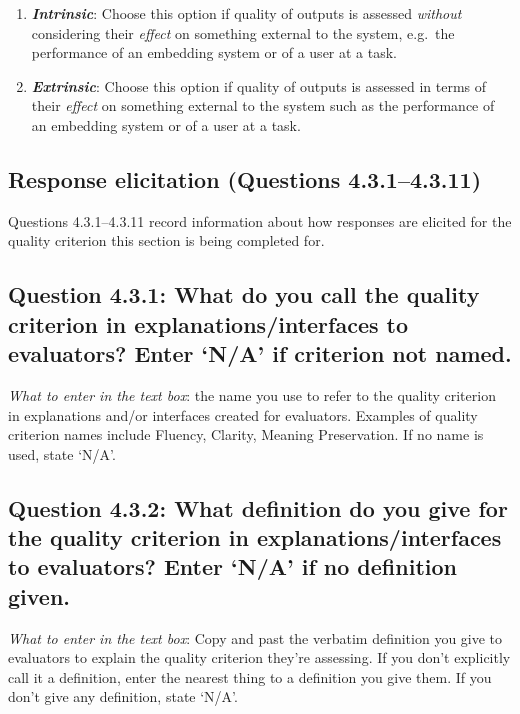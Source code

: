 \documentclass[11pt,a4paper]{article}
\newcommand{\egcvalue}[1]{\textbf{\textit{#1}}}
\begin{document}
\begin{enumerate}[itemsep=0cm,leftmargin=0.5cm,label={\LARGE $\circ$}]
    \item \egcvalue{Intrinsic}: Choose this option if quality of outputs is assessed \textit{without} considering their \textit{effect} on something external to the system, e.g.\ the performance of an embedding system or of a user at a task.
    \item \egcvalue{Extrinsic}: Choose this option if quality of outputs is assessed in terms of their \textit{effect} on something external to the system such as the performance of an embedding system or of a user at a task.
\end{enumerate}

   
\subsection{Response elicitation (Questions 4.3.1--4.3.11)}

Questions 4.3.1--4.3.11 record information about how responses are elicited for the quality criterion this section is being completed for.

\vspace{-.3cm}
\subsection*{Question 4.3.1: What do you call the quality criterion in explanations/interfaces to evaluators?  Enter `N/A' if criterion not named.}

\noindent\textit{What to enter in the text box}: the name you use to refer to the quality criterion in explanations and/or interfaces created for evaluators. Examples of quality criterion names include Fluency, Clarity, Meaning Preservation. If no name is used, state `N/A'.

\subsection*{Question 4.3.2:  What definition do you give for the quality criterion in explanations/interfaces to evaluators? Enter `N/A' if no definition given.}

\noindent\textit{What to enter in the text box}: Copy and past the verbatim definition you give to evaluators to explain the quality criterion they're assessing. If you don't explicitly call it a definition, enter the nearest thing to a definition you give them.  If you don't give any definition, state `N/A'.
\end{document}
